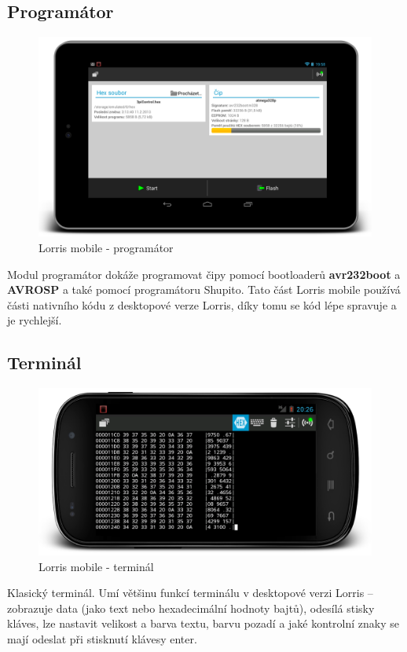 \documentclass[12pt, a4paper, oneside]{article}
\begin{document}
\subsection{Programátor}
\begin{figure}[H]
\begin{center}
\includegraphics[width=\textwidth]{img/mobile_programmer.png}
\caption{Lorris mobile - programátor}
\end{center}
\end{figure}
Modul programátor dokáže programovat čipy pomocí bootloaderů {\bf avr232boot} a {\bf AVROSP} a také pomocí programátoru Shupito.
Tato část Lorris mobile používá části nativního kódu z desktopové verze Lorris, díky tomu se kód lépe spravuje a je rychlejší.

\subsection{Terminál}
\begin{figure}[H]
\begin{center}
\includegraphics[width=\textwidth]{img/mobile_term.png}
\caption{Lorris mobile - terminál}
\end{center}
\end{figure}
Klasický terminál. Umí většinu funkcí terminálu v desktopové verzi Lorris -- zobrazuje data (jako text nebo hexadecimální hodnoty bajtů), odesílá stisky kláves, lze nastavit velikost a barva textu, barvu pozadí a jaké kontrolní znaky se mají odeslat při stisknutí klávesy enter. 
\end{document}
